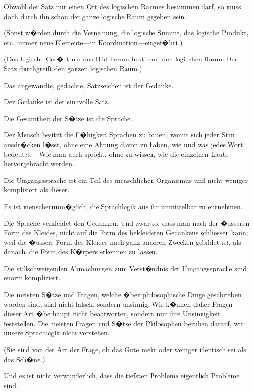 \begin{propositions}
{Obwohl der Satz nur einen Ort des logischen
Raumes bestimmen darf, so muss doch durch
ihn schon der ganze logische Raum gegeben
sein.

(Sonst w�rden durch die Verneinung, die logische
Summe, das logische Produkt, etc.\ immer neue
Elemente---in Ko\-or\-di\-na\-ti\-on---eingef�hrt.)

(Das logische Ger�st um das Bild herum bestimmt
den logischen Raum. Der Satz durchgreift den
ganzen logischen Raum.)}


{Das angewandte, gedachte, Satzzeichen ist der
Gedanke.}


{Der Gedanke ist der sinnvolle Satz.}


{Die Gesamtheit der S�tze ist die Sprache.}


{Der Mensch besitzt die F�higkeit Sprachen zu
bauen, womit sich jeder Sinn ausdr�cken l�sst,
ohne eine Ahnung davon zu haben, wie und was
jedes Wort bedeutet.---Wie man auch spricht, ohne
zu wissen, wie die einzelnen Laute hervorgebracht
werden.

Die Umgangssprache ist ein Teil des menschlichen
Organismus und nicht weniger kompliziert als
dieser.

Es ist menschenunm�glich, die Sprachlogik aus
ihr unmittelbar zu entnehmen.

Die Sprache verkleidet den Gedanken. Und
zwar so, dass man nach der �usseren Form des
Kleides, nicht auf die Form des bekleideten Gedankens
schliessen kann; weil die �ussere Form des
Kleides nach ganz anderen Zwecken gebildet ist, als
danach, die Form des K�rpers erkennen zu lassen.

{\stretchyspace
Die stillschweigenden Abmachungen zum Verst�ndnis
der Umgangssprache sind enorm kompliziert.}}


{Die meisten S�tze und Fragen, welche �ber
philosophische Dinge geschrieben worden sind, sind
nicht falsch, sondern unsinnig. Wir k�nnen daher
Fragen dieser Art �berhaupt nicht beantworten,
sondern nur ihre Unsinnigkeit feststellen. Die
meisten Fragen und S�tze der Philosophen beruhen
darauf,  wir unsere Sprachlogik nicht verstehen.

(Sie sind von der Art der Frage, ob das Gute
\enlargethispage{1pt} %
mehr oder weniger identisch sei als das Sch�ne.)

Und es ist nicht verwunderlich, dass die tiefsten
Probleme eigentlich  Probleme sind.}



\end{propositions}

